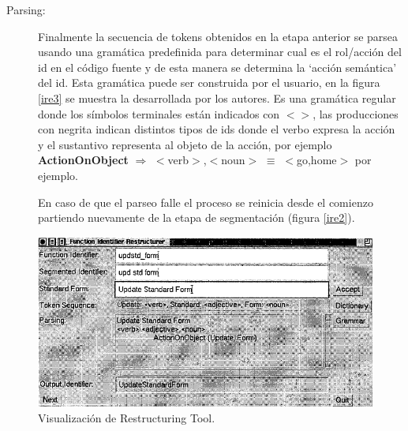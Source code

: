 \documentclass[a4paper,12pt]{report}
\begin{document}
\begin{description}
\item[Parsing:] Finalmente la secuencia de tokens obtenidos en la etapa anterior se parsea usando una gramática predefinida para determinar cual es el rol/acción del id en el código fuente y de esta manera se determina la `acción semántica' del id. Esta gramática puede ser construida por el usuario, en la figura \ref{ire3} se muestra la desarrollada por los autores. Es una gramática regular donde los símbolos terminales están indicados con $<>$, las producciones con negrita indican distintos tipos de ids donde el verbo expresa la acción y el sustantivo representa al objeto de la acción, por ejemplo \textbf{ActionOnObject} $\Rightarrow$ $<$verb$>$,$<$noun$>$ $\equiv$ $<$go,home$>$ por ejemplo.

En caso de que el parseo falle el proceso se reinicia desde el comienzo partiendo nuevamente de la etapa de segmentación\cite{BCPT00} (figura \ref{ire2}).
\end{description}

\begin{figure}[t] %
\centering
\includegraphics[scale= 0.80]{./ire_4.png}
\caption{Visualización de Restructuring Tool.}
\label{ire4}
\end{figure}
\end{document}
